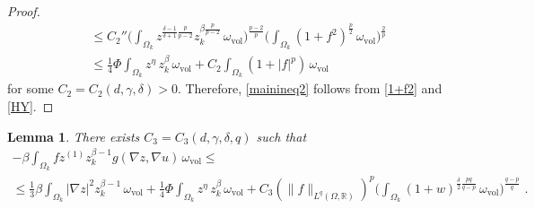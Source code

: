 \documentclass[10pt, a4paper, reqno, oneside]{amsart}
\theoremstyle{plain}
\theoremstyle{definition}
\theoremstyle{plain}
\newtheorem{lemma}[theo]{Lemma}
\theoremstyle{definition}
\theoremstyle{plain}
\renewcommand{\=}{:=}
\begin{document}
\begin{proof}
\begin{equation}
\begin{aligned}
&\leq C_2''
\bigg(\int_{\Omega_k} z^{\frac{\delta-1}{\delta+1}\frac{p}{p-2}}z_k^{\beta\frac{p}{p-2}}\, \omega_{\mathrm{vol}}\bigg)^{\frac{p-2}p}
\bigg(\int_{\Omega_k} (1+f^2)^{\frac{p}2} \, \omega_{\mathrm{vol}}\bigg)^{\frac2p} \\
&\leq \tfrac14\Phi \int_{\Omega_k} z^{\eta}\,z_k^{\beta} \, \omega_{\mathrm{vol}}
+C_2 \int_{\Omega_k} (1+|f|^p) \, \omega_{\mathrm{vol}} 
\end{aligned} \end{equation}
for some $C_2 = C_2(d,\gamma,\delta)>0$. Therefore, \eqref{mainineq2} follows from \eqref{1+f2} and \eqref{HY}.
\end{proof}

\begin{lemma}
There exists $C_3 = C_3(d,\gamma,\delta,q)$ such that
\begin{multline} \label{mainineq3}
-\beta \int_{\Omega_k} f z^{(1)}z_k^{\beta-1}g(\nabla z,\nabla u)\, \omega_{\mathrm{vol}} \leq \\
\leq \tfrac13\beta \int_{\Omega_k} |\nabla z|^2z_k^{\beta-1} \, \omega_{\mathrm{vol}}
+\tfrac14\Phi \int_{\Omega_k}z^{\eta}\, z_k^\beta\, \omega_{\mathrm{vol}}  +C_3(\|f\|_{L^q(\Omega,\mathbb{R})})^p \bigg(\int_{\Omega_k} (1+w)^{\frac{\delta}2\frac{pq}{q-p}} \, \omega_{\mathrm{vol}}\bigg)^{\frac{q-p}{q}} \,\, .
\end{multline}
\end{lemma}
\end{document}

